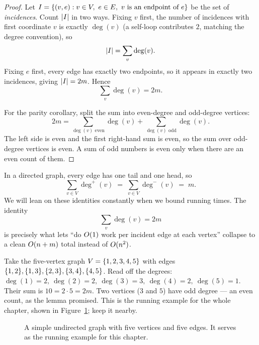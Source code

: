 \begin{proof}
Let $I = \{(v,e) : v \in V,\ e \in E,\ v \text{ is an endpoint of } e\}$ be the
set of \emph{incidences}. Count $\lvert I\rvert$ in two ways. Fixing $v$ first, the
number of incidences with first coordinate $v$ is exactly $\deg(v)$ (a
self-loop contributes $2$, matching the degree convention), so
\[ \lvert I\rvert = \sum_v \deg(v). \]
Fixing $e$ first, every edge has exactly two
endpoints, so it appears in exactly two incidences, giving $\lvert I\rvert = 2m$.
Hence
\[ \sum_v \deg(v) = 2m. \]

For the parity corollary, split the sum into even-degree and odd-degree vertices:
\[
  2m = \sum_{\deg(v) \text{ even}} \deg(v) + \sum_{\deg(v) \text{ odd}} \deg(v).
\]
The left side is even and the first right-hand sum is even, so the sum
over odd-degree vertices is even. A sum of odd numbers is even only when there
are an even count of them.
\end{proof}

In a directed graph, every edge has one tail and one head, so
\[
  \sum_{v\in V}\deg^+(v) \;=\; \sum_{v\in V}\deg^-(v) \;=\; m .
\]
We will lean on these identities constantly when we bound running times. The identity
\[ \sum_v \deg(v) = 2m \]
is precisely what lets ``do $O(1)$ work per incident
edge at each vertex'' collapse to a clean $O(n+m)$ total instead of
$O(n^2)$.

\begin{labbox}
Take the five-vertex graph $V = \{1,2,3,4,5\}$ with edges
$\{1,2\},\{1,3\},\{2,3\},\{3,4\},\{4,5\}$. Read off the degrees:
$\deg(1){=}2,\ \deg(2){=}2,\ \deg(3){=}3,\ \deg(4){=}2,\ \deg(5){=}1$. Their sum
is $10 = 2\cdot 5 = 2m$. Two vertices ($3$ and $5$) have odd degree --- an even
count, as the lemma promised. This is the running example for the whole chapter, shown in Figure~\ref{fig:ch01-five-vertex};
keep it nearby.
\end{labbox}

\begin{figure}[htbp]
\centering
{}
\caption{A simple undirected graph with five vertices and five edges. It serves as the running example for this chapter.}
\label{fig:ch01-five-vertex}
\end{figure}


